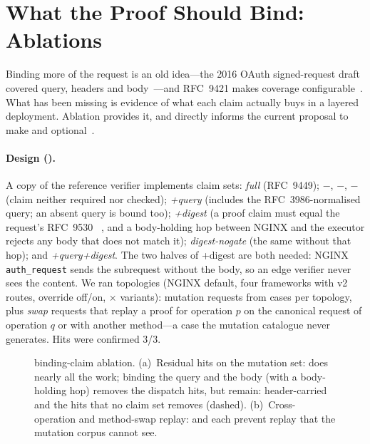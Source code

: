\section{What the Proof Should Bind: Ablations}\label{sec:ablation}

Binding more of the request is an old idea---the 2016 OAuth signed-request
draft covered query, headers and body~\cite{p2:richer2016signedhttp}---and
RFC~9421 makes coverage configurable~\cite{rfc9421}. What has been missing is
evidence of what each claim actually buys in a layered deployment. Ablation
 provides it, and directly informs the current proposal to make \htm and
\htu optional~\cite{allam2026thread}.

\paragraph{Design ().} A copy of the reference verifier implements
\AblOneVariants{} claim sets: \emph{full} (RFC~9449); \emph{$-$\htm},
\emph{$-$\htu}, \emph{$-$\ath} (claim neither required nor checked);
\emph{+query} (\htu includes the RFC~3986-normalised query; an absent query is
bound too); \emph{+digest} (a proof claim must equal the request's RFC~9530
~\cite{w2:rfc9530}, and a body-holding hop between NGINX and
the executor rejects any body that does not match it); \emph{digest-nogate}
(the same without that hop); and \emph{+query+digest}. The two halves of
+digest are both needed: NGINX \texttt{auth\_request} sends the subrequest
without the body, so an edge verifier never sees the content. We ran
\AblOneTopos{} topologies (NGINX default, four frameworks with v2 routes,
override off/on, $\times$ \AblOneVariants{} variants): \AblOneRequests{}
mutation requests from \AblOneCases{} cases per topology, plus
\AblOneSwapRequests{} \emph{swap} requests that replay a proof for operation
$p$ on the canonical request of operation $q$ or with another method---a case
the mutation catalogue never generates. Hits were confirmed 3/3.

\begin{figure}[t]
\centering
{}
\caption{ binding-claim ablation. (a)~Residual hits on the mutation set:
\htu does nearly all the work; binding the query and the body (with a
body-holding hop) removes the dispatch hits, but \AblOneHitsQueryDigest{}
remain: header-carried \GA and the \AblOneGTwoSurvive{} \GB hits that no claim
set removes (dashed). (b)~Cross-operation and method-swap replay: \htm and \htu
each prevent replay that the mutation corpus cannot see.}
\label{fig:a1}
\end{figure}

